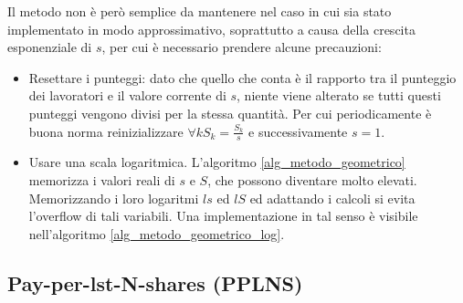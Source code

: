 Il metodo non è però semplice da mantenere nel caso in cui sia stato implementato in modo approssimativo, soprattutto a causa della crescita esponenziale di $s$, per cui è necessario prendere alcune precauzioni:
\begin{itemize}
    \item Resettare i punteggi: dato che quello che conta è il rapporto tra il punteggio dei lavoratori e il valore corrente di $s$, niente viene alterato se tutti questi punteggi vengono divisi per la stessa quantità. Per cui periodicamente è buona norma reinizializzare $\forall k S_k = \frac{S_k}{s}$ e successivamente $s=1$.
    \item Usare una scala logaritmica. L'algoritmo \ref{alg_metodo_geometrico} memorizza i valori reali di $s$ e $S$, che possono diventare molto elevati. Memorizzando i loro logaritmi $ls$ ed $lS$ ed adattando i calcoli si evita l'overflow di tali variabili. Una implementazione in tal senso è visibile nell'algoritmo \ref{alg_metodo_geometrico_log}.
\end{itemize}



\subsection{Pay-per-lst-N-shares (PPLNS)}

